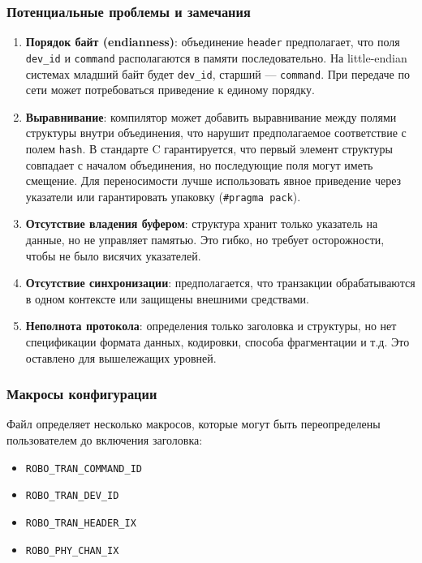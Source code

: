 \documentclass[a4paper,12pt]{article}
\begin{document}
\subsubsection{Потенциальные проблемы и замечания}

\begin{enumerate}
    \item \textbf{Порядок байт (endianness)}: объединение \texttt{header} предполагает, что поля \texttt{dev\_id} и \texttt{command} располагаются в памяти последовательно. На little-endian системах младший байт будет \texttt{dev\_id}, старший — \texttt{command}. При передаче по сети может потребоваться приведение к единому порядку.
    \item \textbf{Выравнивание}: компилятор может добавить выравнивание между полями структуры внутри объединения, что нарушит предполагаемое соответствие с полем \texttt{hash}. В стандарте C гарантируется, что первый элемент структуры совпадает с началом объединения, но последующие поля могут иметь смещение. Для переносимости лучше использовать явное приведение через указатели или гарантировать упаковку (\texttt{\#pragma pack}).
    \item \textbf{Отсутствие владения буфером}: структура хранит только указатель на данные, но не управляет памятью. Это гибко, но требует осторожности, чтобы не было висячих указателей.
    \item \textbf{Отсутствие синхронизации}: предполагается, что транзакции обрабатываются в одном контексте или защищены внешними средствами.
    \item \textbf{Неполнота протокола}: определения только заголовка и структуры, но нет спецификации формата данных, кодировки, способа фрагментации и т.д. Это оставлено для вышележащих уровней.
\end{enumerate}

\subsubsection{Макросы конфигурации}

Файл определяет несколько макросов, которые могут быть переопределены пользователем до включения заголовка:

\begin{itemize}
    \item \texttt{ROBO\_TRAN\_COMMAND\_ID}
    \item \texttt{ROBO\_TRAN\_DEV\_ID}
    \item \texttt{ROBO\_TRAN\_HEADER\_IX}
    \item \texttt{ROBO\_PHY\_CHAN\_IX}
\end{itemize}
\end{document}
